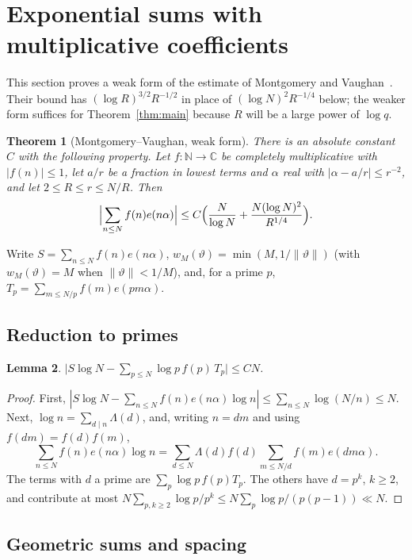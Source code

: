 \documentclass[11pt]{amsart}
\newtheorem{theorem}{Theorem}
\newtheorem{lemma}[theorem]{Lemma}
\theoremstyle{definition}
\theoremstyle{remark}
\numberwithin{equation}{section}
\newcommand{\e}{e}
\newcommand{\nint}[1]{\|#1\|}
\begin{document}
\section{Exponential sums with multiplicative coefficients}\label{sec:mv}

This section proves a weak form of the estimate of Montgomery and
Vaughan~\cite[Corollary~1]{mv77}. Their bound has $(\log R)^{3/2}R^{-1/2}$ in place
of $(\log N)^2R^{-1/4}$ below; the weaker form suffices for
Theorem~\ref{thm:main} because $R$ will be a large power of $\log q$.

\begin{theorem}[Montgomery--Vaughan, weak form]\label{thm:mv}
There is an absolute constant $C$ with the following property. Let
$f:\mathbb N\to\mathbb C$ be completely multiplicative with $|f(n)|\le1$, let $a/r$
be a fraction in lowest terms and $\alpha$ real with $|\alpha-a/r|\le r^{-2}$, and
let $2\le R\le r\le N/R$. Then
\[
\Bigl|\sum_{n\le N}f(n)\e(n\alpha)\Bigr|\le C\Bigl(\frac N{\log N}+\frac{N(\log N)^2}{R^{1/4}}\Bigr).
\]
\end{theorem}

Write $S=\sum_{n\le N}f(n)\e(n\alpha)$, $w_M(\vartheta)=\min(M,1/\nint\vartheta)$
(with $w_M(\vartheta)=M$ when $\nint\vartheta<1/M$), and, for a prime $p$,
$T_p=\sum_{m\le N/p}f(m)\e(pm\alpha)$.

\subsection{Reduction to primes}

\begin{lemma}\label{lem:reduction}
$\bigl|S\log N-\sum_{p\le N}\log p\,f(p)\,T_p\bigr|\le CN$.
\end{lemma}

\begin{proof}
First, $|S\log N-\sum_{n\le N}f(n)\e(n\alpha)\log n|\le\sum_{n\le N}\log(N/n)\le N$.
Next, $\log n=\sum_{d\mid n}\Lambda(d)$, and, writing $n=dm$ and using
$f(dm)=f(d)f(m)$,
\[
\sum_{n\le N}f(n)\e(n\alpha)\log n=\sum_{d\le N}\Lambda(d)f(d)\sum_{m\le N/d}f(m)\e(dm\alpha).
\]
The terms with $d$ a prime are $\sum_p\log p\,f(p)T_p$. The others have
$d=p^k$, $k\ge2$, and contribute at most $N\sum_{p,k\ge2}\log p/p^k\le N\sum_p\log
p/(p(p-1))\ll N$.
\end{proof}

\subsection{Geometric sums and spacing}
\end{document}
